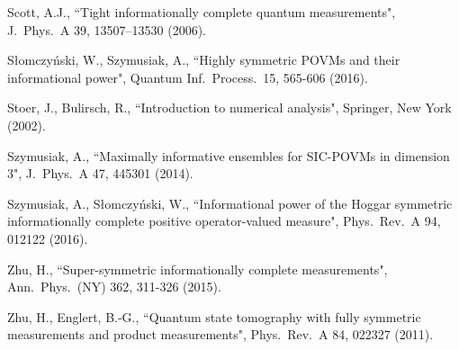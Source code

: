 \documentclass[11pt]{article}
\theoremstyle{remark}
\theoremstyle{definition}
\begin{document}
\begin{thebibliography}{99}
 Scott, A.J., ``Tight informationally complete quantum measurements", J.\ Phys.\ A 39, 13507–13530 (2006).

 S\l omczy\'nski, W., Szymusiak, A., ``Highly symmetric POVMs and their informational power", Quantum Inf.\ Process.\ 15, 565-606 (2016).

 Stoer, J., Bulirsch, R., ``Introduction to numerical analysis", Springer, New York (2002).

 Szymusiak, A., ``Maximally informative ensembles for SIC-POVMs in dimension 3", J.\ Phys.\ A 47, 445301 (2014).

 Szymusiak, A., S\l omczy\'nski, W., ``Informational power of the Hoggar symmetric informationally complete positive operator-valued measure", Phys.\ Rev.\ A 94, 012122 (2016).


 Zhu, H., ``Super-symmetric informationally complete measurements", Ann.\ Phys.\ (NY) 362, 311-326 (2015).

 Zhu, H., Englert, B.-G., ``Quantum state tomography with fully symmetric measurements and
product measurements", Phys.\ Rev.\ A 84, 022327 (2011).

\end{thebibliography}
\end{document}
